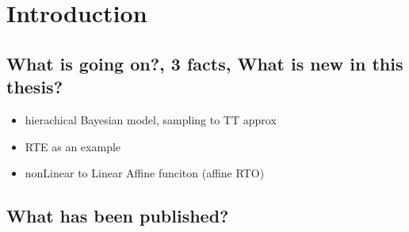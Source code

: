 \chapter{Introduction}

\section{What is going on?, 3 facts, What is new in this thesis?}
\begin{itemize}
	\item hierachical Bayesian model, sampling to TT approx
	\item RTE as an example
	\item nonLinear to Linear Affine funciton (affine RTO)
\end{itemize}
\section{What has been published?}

